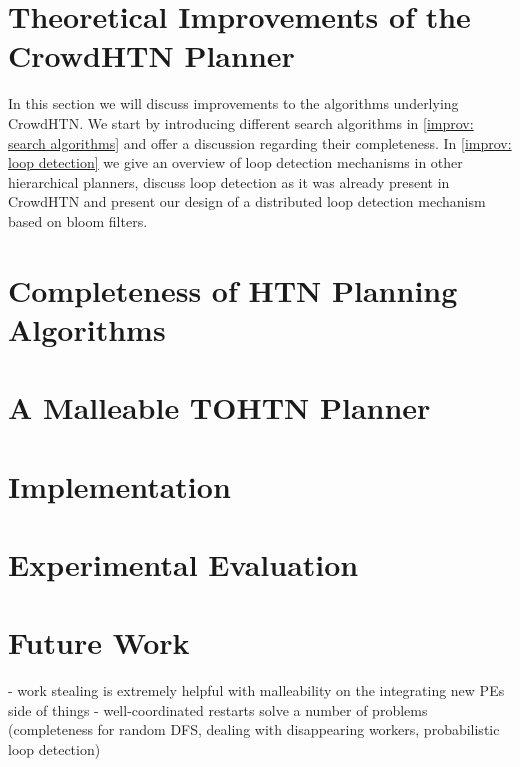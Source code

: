 \documentclass[enabledeprecatedfontcommands,12pt,a4paper,twoside]{scrartcl}
\numberwithin{equation}{section}
\begin{document}
\section{Theoretical Improvements of the CrowdHTN Planner}
In this section we will discuss improvements to the algorithms underlying CrowdHTN. We start by introducing different search algorithms in \ref{improv: search algorithms} and offer a discussion regarding their completeness. In \ref{improv: loop detection} we give an overview of loop detection mechanisms in other hierarchical planners, discuss loop detection as it was already present in CrowdHTN and present our design of a distributed loop detection mechanism based on bloom filters.



\pagebreak
\section{Completeness of HTN Planning Algorithms}
\label{improv: completeness}

\clearpage
\pagebreak
\section{A Malleable TOHTN Planner}
\label{malleable: overview}


\pagebreak
\section{Implementation}


\clearpage
\pagebreak
\section{Experimental Evaluation}


\pagebreak
\section{Future Work}

- work stealing is extremely helpful with malleability on the integrating new PEs side of things
- well-coordinated restarts solve a number of problems (completeness for random DFS, dealing with disappearing workers, probabilistic loop detection)



\clearpage




\end{document}

